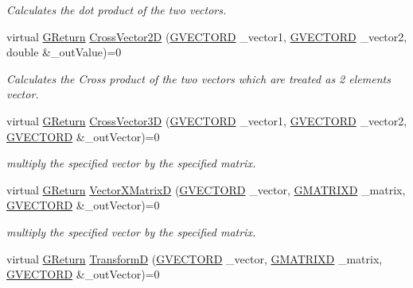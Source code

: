 \begin{DoxyCompactItemize}
\begin{DoxyCompactList}\small\item\em Calculates the dot product of the two vectors. \end{DoxyCompactList}\item 
virtual \mbox{\hyperlink{namespace_g_w_a67a839e3df7ea8a5c5686613a7a3de21}{G\+Return}} \mbox{\hyperlink{class_g_w_1_1_m_a_t_h_1_1_g_vector_a96ef18a518dfbdbda5727e7799844b15}{Cross\+Vector2D}} (\mbox{\hyperlink{struct_g_w_1_1_m_a_t_h_1_1_g_v_e_c_t_o_r_d}{G\+V\+E\+C\+T\+O\+RD}} \+\_\+vector1, \mbox{\hyperlink{struct_g_w_1_1_m_a_t_h_1_1_g_v_e_c_t_o_r_d}{G\+V\+E\+C\+T\+O\+RD}} \+\_\+vector2, double \&\+\_\+out\+Value)=0
\begin{DoxyCompactList}\small\item\em Calculates the Cross product of the two vectors which are treated as 2 elements vector. \end{DoxyCompactList}\item 
virtual \mbox{\hyperlink{namespace_g_w_a67a839e3df7ea8a5c5686613a7a3de21}{G\+Return}} \mbox{\hyperlink{class_g_w_1_1_m_a_t_h_1_1_g_vector_a3556471c23dbd6d8a7e44960153f1dae}{Cross\+Vector3D}} (\mbox{\hyperlink{struct_g_w_1_1_m_a_t_h_1_1_g_v_e_c_t_o_r_d}{G\+V\+E\+C\+T\+O\+RD}} \+\_\+vector1, \mbox{\hyperlink{struct_g_w_1_1_m_a_t_h_1_1_g_v_e_c_t_o_r_d}{G\+V\+E\+C\+T\+O\+RD}} \+\_\+vector2, \mbox{\hyperlink{struct_g_w_1_1_m_a_t_h_1_1_g_v_e_c_t_o_r_d}{G\+V\+E\+C\+T\+O\+RD}} \&\+\_\+out\+Vector)=0
\begin{DoxyCompactList}\small\item\em multiply the specified vector by the specified matrix. \end{DoxyCompactList}\item 
virtual \mbox{\hyperlink{namespace_g_w_a67a839e3df7ea8a5c5686613a7a3de21}{G\+Return}} \mbox{\hyperlink{class_g_w_1_1_m_a_t_h_1_1_g_vector_a07512cdb954882137d3e39d3b23e20de}{Vector\+X\+MatrixD}} (\mbox{\hyperlink{struct_g_w_1_1_m_a_t_h_1_1_g_v_e_c_t_o_r_d}{G\+V\+E\+C\+T\+O\+RD}} \+\_\+vector, \mbox{\hyperlink{struct_g_w_1_1_m_a_t_h_1_1_g_m_a_t_r_i_x_d}{G\+M\+A\+T\+R\+I\+XD}} \+\_\+matrix, \mbox{\hyperlink{struct_g_w_1_1_m_a_t_h_1_1_g_v_e_c_t_o_r_d}{G\+V\+E\+C\+T\+O\+RD}} \&\+\_\+out\+Vector)=0
\begin{DoxyCompactList}\small\item\em multiply the specified vector by the specified matrix. \end{DoxyCompactList}\item 
virtual \mbox{\hyperlink{namespace_g_w_a67a839e3df7ea8a5c5686613a7a3de21}{G\+Return}} \mbox{\hyperlink{class_g_w_1_1_m_a_t_h_1_1_g_vector_a7930e1cb3b872c73af46d4ce30264b99}{TransformD}} (\mbox{\hyperlink{struct_g_w_1_1_m_a_t_h_1_1_g_v_e_c_t_o_r_d}{G\+V\+E\+C\+T\+O\+RD}} \+\_\+vector, \mbox{\hyperlink{struct_g_w_1_1_m_a_t_h_1_1_g_m_a_t_r_i_x_d}{G\+M\+A\+T\+R\+I\+XD}} \+\_\+matrix, \mbox{\hyperlink{struct_g_w_1_1_m_a_t_h_1_1_g_v_e_c_t_o_r_d}{G\+V\+E\+C\+T\+O\+RD}} \&\+\_\+out\+Vector)=0

\end{DoxyCompactItemize}
